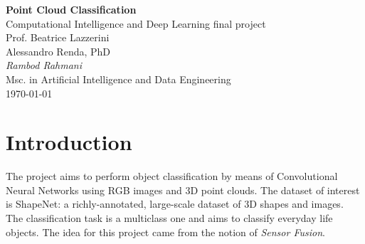 \documentclass[11pt,a4paper]{article}
\begin{document}
\begin{center}
	\Large\textbf{Point Cloud Classification}\\
	\vspace{0.2cm}
	\large{Computational Intelligence and Deep Learning final project}\\
	\large{Prof. Beatrice Lazzerini}\\
	\large{Alessandro Renda, PhD}\\
	\vspace{1.0cm}
	\large\textit{Rambod Rahmani}\\
	\vspace{0.2cm}
	\normalsize{Msc. in Artificial Intelligence and Data Engineering}\\
	\vspace{1.0cm}
	\today
\end{center}
\vspace{1cm}
\setcounter{tocdepth}{2}
\tableofcontents

\newpage
\section{Introduction}
The project aims to perform object classification by means of Convolutional Neural Networks using RGB images and 3D point clouds. The dataset of interest is ShapeNet: a richly-annotated, large-scale dataset of 3D shapes and images\cite{shapenet2015}.\\
The classification task is a multiclass one and aims to classify everyday life objects. The idea for this project came from the notion of \textit{Sensor Fusion}.
\end{document}
